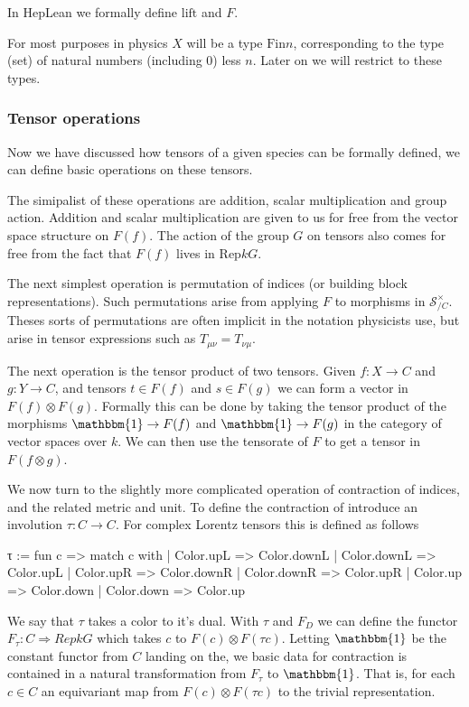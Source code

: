 \documentclass[a4paper, 11pt]{article}
\begin{document}
In HepLean we formally define $\mathrm{lift}$ and $F$. 

For most purposes in physics $X$ will be a type $\mathrm{Fin} n$, corresponding to the type 
(set) of natural numbers (including 0) less $n$. Later on we will restrict to these types.

\subsubsection{Tensor operations} \label{sec:tensorOperations}

Now we have discussed how tensors of a given species can be formally defined, we can define 
basic operations on these tensors. 


The simipalist of these operations are addition, scalar multiplication and group action.
Addition and scalar multiplication are given to us for free from the vector space structure 
on $F(f)$. The action of the group $G$ on tensors also comes for free from the fact that 
$F(f)$ lives in $\mathrm{Rep} k G$.

The next simplest operation is permutation of indices (or building block representations).
Such permutations arise from applying $F$ to morphisms in $\mathcal{S}_{/C}^\times$. 
Theses sorts of permutations are often implicit in the notation physicists use, but arise 
in tensor expressions such as $T_{\mu \nu} = T_{\nu \mu}$.

The next operation is the tensor product of two tensors. Given $f : X \to C$ and
$g : Y \to C$, and tensors $t \in F(f)$ and $s \in F(g)$ we can form a vector in 
$F(f) \otimes F(g)$. Formally this can be done by taking the tensor product of the morphisms
$\mathbbm{1} \to F(f)$ and $\mathbbm{1} \to F(g)$ in the category of vector spaces over $k$.
We can then use the tensorate of $F$ to get a tensor in $F(f \otimes g)$.

We now turn to the slightly more complicated operation of contraction of indices, 
and the related metric and unit. 
To define the contraction of introduce an involution $\tau : C \to C$. For complex Lorentz tensors
this is defined as follows
\begin{code} 
  τ := fun c =>
    match c with
    | Color.upL => Color.downL
    | Color.downL => Color.upL
    | Color.upR => Color.downR
    | Color.downR => Color.upR
    | Color.up => Color.down
    | Color.down => Color.up
\end{code}
We say that $\tau$ takes a color to it's dual. With $\tau$ and $F_D$ we can define 
the functor  $F_\tau : C \Rightarrow Rep k G$ which takes $c$ to $F(c) \otimes F(\tau c)$. 
Letting $\mathbbm{1}$ be the constant functor from $C$ landing on the, we basic data 
for contraction is contained in a natural transformation from $F_\tau$ to $\mathbbm{1}$.
That is, for each $c \in C$ an equivariant map from $F(c) \otimes F(\tau c)$ to the trivial 
representation. 
\end{document}
